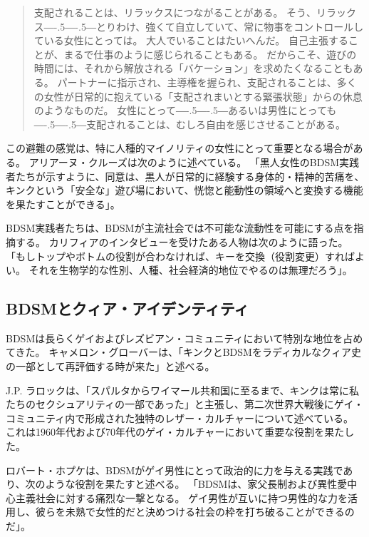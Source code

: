 \documentclass[paper=a4,book,openany]{jlreq}
\def\DDASH{―\kern-.5\zw―\kern-.5\zw―}
\begin{document}
\begin{quote}
  支配されることは、リラックスにつながることがある。
そう、リラックス{\DDASH}とりわけ、強くて自立していて、常に物事をコントロールしている女性にとっては。
大人でいることはたいへんだ。
自己主張することが、まるで仕事のように感じられることもある。
だからこそ、遊びの時間には、それから解放される「バケーション」を求めたくなることもある。
パートナーに指示され、主導権を握られ、支配されることは、多くの女性が日常的に抱えている「支配されまいとする緊張状態」からの休息のようなものだ。
女性にとって{\DDASH}あるいは男性にとっても{\DDASH}支配されることは、むしろ自由を感じさせることがある。
\citep{cicero12:_six_myths_kink_bdsm}
\end{quote}

この避難の感覚は、特に人種的マイノリティの女性にとって重要となる場合がある。
アリアーヌ・クルーズは次のように述べている。
「黒人女性のBDSM実践者たちが示すように、同意は、黒人が日常的に経験する身体的・精神的苦痛を、キンクという「安全な」遊び場において、恍惚と能動性の領域へと変換する機能を果たすことができる」\citep{wachter-grene16:_conver_arian_cruz}。

BDSM実践者たちは、BDSMが主流社会では不可能な流動性を可能にする点を指摘する。
カリフィアのインタビューを受けたある人物は次のように語った。
「もしトップやボトムの役割が合わなければ、キーを交換（役割変更）すればよい。
それを生物学的な性別、人種、社会経済的地位でやるのは無理だろう」\citep[pp. 173-174]{califia00:_public_sex}。

\subsection{BDSMとクィア・アイデンティティ}

BDSMは長らくゲイおよびレズビアン・コミュニティにおいて特別な地位を占めてきた。
キャメロン・グローバーは、「キンクとBDSMをラディカルなクィア史の一部として再評価する時が来た」と述べる\citep{glover18:_its_time_recen_kink_bdsm}。

J.P. ラロックは、「スパルタからワイマール共和国に至るまで、キンクは常に私たちのセクシュアリティの一部であった」と主張し、第二次世界大戦後にゲイ・コミュニティ内で形成された独特のレザー・カルチャーについて述べている。
これは1960年代および70年代のゲイ・カルチャーにおいて重要な役割を果たした\citep{larocque14:_brief_histor_bdsm}。

ロバート・ホプケは、BDSMがゲイ男性にとって政治的に力を与える実践であり、次のような役割を果たすと述べる。
「BDSMは、家父長制および異性愛中心主義社会に対する痛烈な一撃となる。
ゲイ男性が互いに持つ男性的な力を活用し、彼らを未熟で女性的だと決めつける社会の枠を打ち破ることができるのだ」\citep[p.71]{hopcke91:_jung_jungian_homos}。
\end{document}
